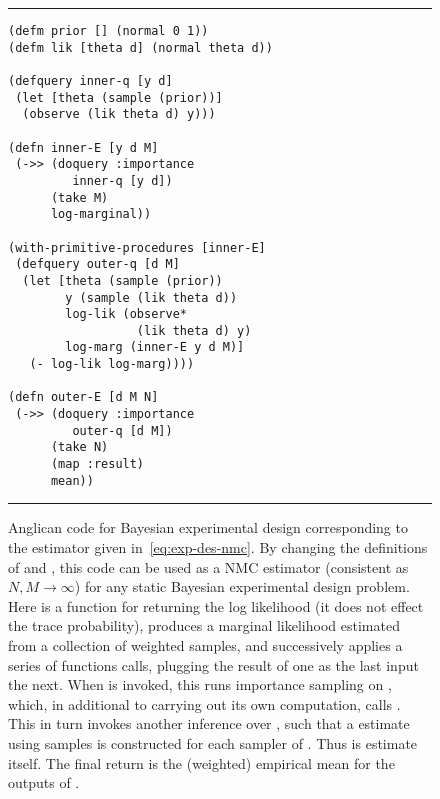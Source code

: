 \begin{figure}[t]
			\centering	
			\vspace{-10pt}		
			\rule{\linewidth}{0.4pt}
			\vspace{-28pt}		
	\begin{lstlisting}[basicstyle=\ttfamily\footnotesize,multicols=2,frame=none]
(defm prior [] (normal 0 1))
(defm lik [theta d] (normal theta d))

(defquery inner-q [y d]
 (let [theta (sample (prior))]
  (observe (lik theta d) y)))

(defn inner-E [y d M]
 (->> (doquery :importance 
         inner-q [y d])
      (take M)
      log-marginal))
      
(with-primitive-procedures [inner-E]
 (defquery outer-q [d M]
  (let [theta (sample (prior))
        y (sample (lik theta d))
        log-lik (observe* 
                  (lik theta d) y)
        log-marg (inner-E y d M)]
   (- log-lik log-marg))))

(defn outer-E [d M N]
 (->> (doquery :importance 
         outer-q [d M])
      (take N)
      (map :result)
      mean))
	\end{lstlisting}
	\vspace{-20pt}		
	\rule{\linewidth}{0.4pt}
	\caption{Anglican code for Bayesian experimental design corresponding to the estimator
		given in~\eqref{eq:exp-des-nmc}.  By changing the definitions of 
		 and , this code can be used as a
		 NMC estimator (consistent as $N,M\rightarrow\infty$) for any static
		 Bayesian experimental design problem.
		 Here  is a function for returning the log likelihood (it does not
		 effect the trace probability),  produces a marginal likelihood estimated
		 from a collection of weighted samples,
		 and \lsi{->>} successively applies a series of functions calls,
		 plugging the result of one as the last input the next.  When  is invoked,
		 this runs importance sampling on , which, in additional to carrying out
		 its own computation, calls .  This in turn invokes another inference over
		 , such that a \mc estimate using  samples is constructed for
		 each sampler of .  Thus  is \mc estimate itself.
		 The final return is the (weighted) empirical mean for
		 the outputs of .
	\label{fig:nest:exp}}
\vspace{-5pt}
\end{figure}

